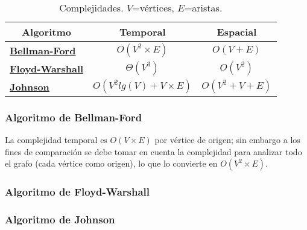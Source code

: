 \documentclass[../tp2_grupo404.tex]{subfiles}
\begin{document}
\begin{table}[H]
    \centering
    \begin{tabular}{@{}lcc@{}}
    \toprule
    \multicolumn{1}{c}{\textbf{Algoritmo}}                 & \textbf{Temporal}          & \textbf{Espacial} \\ \midrule
    \hyperref[sec:complej_Bellman]{\textbf{Bellman-Ford}}  & $O(V^2\times E)$           & $O(V+E)$     \\
    \hyperref[sec:complej_Floyd]{\textbf{Floyd-Warshall}}  & $\Theta(V^3)$              & $O(V^2)$          \\
    \hyperref[sec:complej_Johnson]{\textbf{Johnson}}       & $O(V^2 lg(V) + V\times E)$ & $O(V^2+V+E)$      \\ \bottomrule
    \end{tabular}
    \caption{\label{tabComplejidades}Complejidades. $V$=vértices, $E$=aristas.}
\end{table}

\subsubsection{Algoritmo de Bellman-Ford}\label{sec:complej_Bellman}
La complejidad temporal es $O(V\times E)$ por vértice de origen;
sin embargo a los fines de comparación se debe tomar en cuenta
la complejidad para analizar todo el grafo (cada vértice como origen),
lo que lo convierte en $O(V^2\times E)$.

\subsubsection{Algoritmo de Floyd-Warshall}\label{sec:complej_Floyd}

\subsubsection{Algoritmo de Johnson}\label{sec:complej_Johnson}

\end{document}
